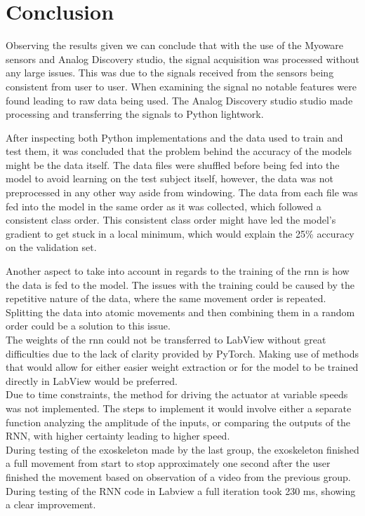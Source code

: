 \section{Conclusion}
Observing the results given we can conclude that with the use of the Myoware sensors and Analog Discovery studio, the signal 
acquisition was processed without any large issues. This was due to the signals received from the sensors being consistent 
from user to user. When examining the signal no notable features were found leading to raw data being used.
The Analog Discovery studio studio made processing and transferring the signals to Python lightwork.


After inspecting both Python implementations and the data used to train and test them, it was concluded that the problem behind the accuracy
of the models might be the data itself. The data files were shuffled before being fed into the model to avoid learning on the test subject
itself, however, the data was not preprocessed in any other way aside from windowing. The data from each file was fed into the model in the 
same order as it was collected, which followed a consistent class order. This consistent class order might have led the model's gradient to 
get stuck in a local minimum, which would explain the 25\% accuracy on the validation set.

Another aspect to take into account in regards to the training of the \acrshort{rnn} is how the data is fed to the model. The issues
with the training could be caused by the repetitive nature of the data, where the same movement order is repeated. Splitting the data
into atomic movements and then combining them in a random order could be a solution to this issue.
\\

The weights of the \acrshort{rnn} could not be transferred to LabView without great difficulties due to the lack of clarity provided by
PyTorch. Making use of methods that would allow for either easier weight extraction or for the model to be trained
directly in LabView would be preferred.
\\

Due to time constraints, the method for driving the actuator at variable speeds was not implemented. The steps to implement it
would involve either a separate function analyzing the amplitude of the inputs, or comparing the outputs of the RNN,
with higher certainty leading to higher speed.
\\

During testing of the exoskeleton made by the last group, the exoskeleton finished a full movement from start to stop approximately 
one second after the user finished the movement based on observation of a video from the previous group. During testing of the RNN 
code in Labview a full iteration took 230 ms, showing a clear improvement.


